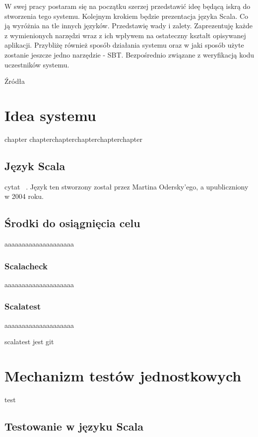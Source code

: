\documentclass[brudnopis]{xmgr}
\begin{document}
W swej pracy postaram się na początku szerzej przedstawić ideę będącą iskrą do stworzenia tego systemu. Kolejnym krokiem będzie prezentacja języka Scala. Co ją wyróżnia na tle innych języków. Przedstawię wady i zalety. Zaprezentuję każde z wymienionych narzędzi wraz z ich wpływem na ostateczny kształt opisywanej aplikacji. Przybliżę również sposób działania systemu oraz w jaki sposób użyte zostanie jeszcze jedno narzędzie - SBT. Bezpośrednio związane z weryfikacją kodu uczestników systemu.

Źródła

\chapter{Idea systemu}

chapter chapterchapterchapterchapterchapter 

\section{Język Scala}

cytat ~\cite[s.~123]{Elmasri:2002:CMC}. 
Język ten stworzony został przez Martina Odersky'ego, a upubliczniony w 2004 roku.

    
\section{Środki do osiągnięcia celu}

aaaaaaaaaaaaaaaaaaaa

\subsection{Scalacheck}

aaaaaaaaaaaaaaaaaaaa

\subsection{Scalatest} 

aaaaaaaaaaaaaaaaaaaa

scalatest jest git
      
\chapter{Mechanizm testów jednostkowych}

test
    
\section{Testowanie w języku Scala}
\end{document}
